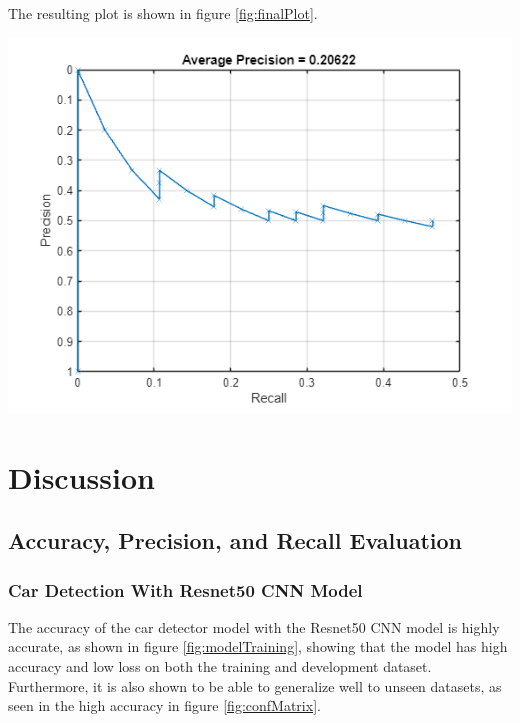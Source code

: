 \documentclass[man]{apa7}
\begin{document}
The resulting plot is shown in figure \ref{fig:finalPlot}.

\newpage

\begin{minipage}{\linewidth}
  \includegraphics[height=\textheight/2,width=\textwidth/1]{figures/finalPrecRecPlot.png}
  \label{fig:finalPlot}
\end{minipage}

\newpage

\section{Discussion}

\subsection{Accuracy, Precision, and Recall Evaluation}

\subsubsection{Car Detection With Resnet50 CNN Model}

The accuracy of the car detector model with the Resnet50 CNN model is highly accurate, as shown in figure \ref{fig:modelTraining}, showing that the model has high accuracy and low loss on both the training and development dataset. Furthermore, it is also shown to be able to generalize well to unseen datasets, as seen in the high accuracy in figure \ref{fig:confMatrix}.
\end{document}
